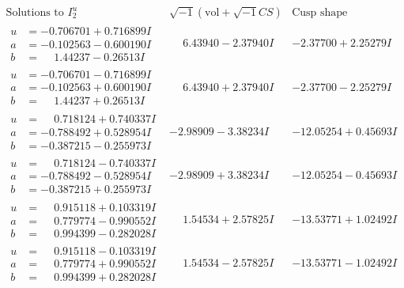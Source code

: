 \documentclass[1p]{elsarticle_modified}
\theoremstyle{definition}
\newcommand{\I}{\sqrt{-1}}
\begin{document}
$$\begin{array}{c|c|c}  
\text{Solutions to }I^u_{2}& \I (\text{vol} + \sqrt{-1}CS) & \text{Cusp shape}\\
 \hline 
\begin{aligned}
u &= -0.706701 + 0.716899 I \\
a &= -0.102563 - 0.600190 I \\
b &= \phantom{-}1.44237 - 0.26513 I\end{aligned}
 & \phantom{-}6.43940 - 2.37940 I & -2.37700 + 2.25279 I \\ \hline\begin{aligned}
u &= -0.706701 - 0.716899 I \\
a &= -0.102563 + 0.600190 I \\
b &= \phantom{-}1.44237 + 0.26513 I\end{aligned}
 & \phantom{-}6.43940 + 2.37940 I & -2.37700 - 2.25279 I \\ \hline\begin{aligned}
u &= \phantom{-}0.718124 + 0.740337 I \\
a &= -0.788492 + 0.528954 I \\
b &= -0.387215 - 0.255973 I\end{aligned}
 & -2.98909 - 3.38234 I & -12.05254 + 0.45693 I \\ \hline\begin{aligned}
u &= \phantom{-}0.718124 - 0.740337 I \\
a &= -0.788492 - 0.528954 I \\
b &= -0.387215 + 0.255973 I\end{aligned}
 & -2.98909 + 3.38234 I & -12.05254 - 0.45693 I \\ \hline\begin{aligned}
u &= \phantom{-}0.915118 + 0.103319 I \\
a &= \phantom{-}0.779774 - 0.990552 I \\
b &= \phantom{-}0.994399 - 0.282028 I\end{aligned}
 & \phantom{-}1.54534 + 2.57825 I & -13.53771 + 1.02492 I \\ \hline\begin{aligned}
u &= \phantom{-}0.915118 - 0.103319 I \\
a &= \phantom{-}0.779774 + 0.990552 I \\
b &= \phantom{-}0.994399 + 0.282028 I\end{aligned}
 & \phantom{-}1.54534 - 2.57825 I & -13.53771 - 1.02492 I \\ \hline\begin{aligned}

\end{aligned}
\end{array}$$
\end{document}
